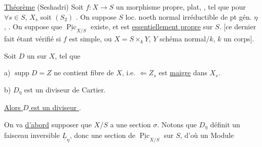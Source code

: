 \uline{Théorème} (Seshadri) Soit $f:X\longrightarrow S$ un morphisme propre, plat, , tel que pour $\forall s\in S$,  $X_s$ soit $(S_2)$ . On suppose $S$ loc. noeth normal irréductible de pt gén. $\eta$, . On suppose que $\underline{\operatorname{Pic}}_{X/S}$ existe, et est \uline{essentiellement propre} sur $S$. [ce dernier fait étant vérifié si $f$ est simple, ou $X=S\times_kY$, $Y$ schéma normal$/k$, $k$ un corps].

Soit $D$ un   sur $X$, tel que

a) $\operatorname{supp}D=Z$ ne contient  \deleted{\unsure{$\eta$}}   fibre de $X$, i.e. $\Leftarrow Z_s$ est \uline{maigre} dans $X_s$.

b) $D_\eta$ est un diviseur de Cartier.

\uline{Alors $D$ est un diviseur }.


On va \uline{d'abord} supposer que $X/S$ a une section $\sigma$. Notons que $D_\eta$ définit un faisceau inversible $\underline L_\eta$, donc une section  de $\underline{\operatorname{Pic}}_{X/S}$ sur $S$, d'où un Module
